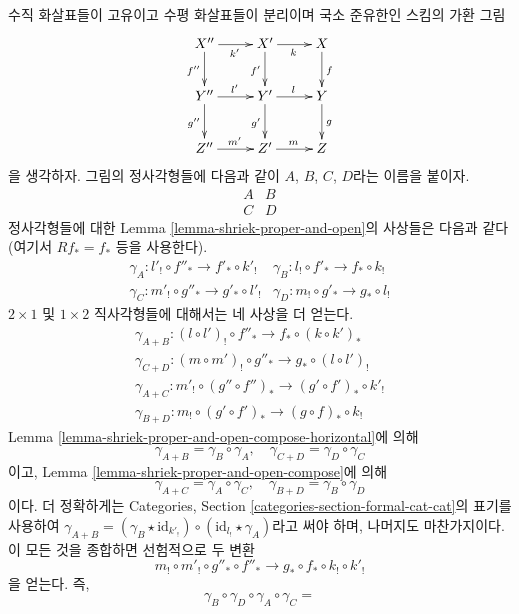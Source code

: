 \begin{remark}
\label{remark-going-around}
수직 화살표들이 고유이고 수평 화살표들이 분리이며 국소 준유한인
스킴의 가환 그림
$$
\xymatrix{
X'' \ar[r]_{k'} \ar[d]_{f''} & X' \ar[r]_k \ar[d]_{f'} & X \ar[d]^f \\
Y'' \ar[r]^{l'} \ar[d]_{g''} & Y' \ar[r]^l \ar[d]_{g'} & Y \ar[d]^g \\
Z'' \ar[r]^{m'} & Z' \ar[r]^m & Z
}
$$
을 생각하자. 그림의 정사각형들에 다음과 같이 $A$, $B$, $C$, $D$라는
이름을 붙이자.
$$
\begin{matrix}
A & B \\
C & D
\end{matrix}
$$
정사각형들에 대한 Lemma \ref{lemma-shriek-proper-and-open}의 사상들은
다음과 같다(여기서 $Rf_* = f_*$ 등을 사용한다).
$$
\begin{matrix}
\gamma_A : l'_! \circ f''_* \to f'_* \circ k'_! &
\gamma_B : l_! \circ f'_* \to f_* \circ k_! \\
\gamma_C : m'_! \circ g''_* \to g'_* \circ l'_! &
\gamma_D : m_! \circ g'_* \to g_* \circ l_!
\end{matrix}
$$
$2 \times 1$ 및 $1 \times 2$ 직사각형들에 대해서는 네 사상을 더
얻는다.
$$
\begin{matrix}
\gamma_{A + B} :
(l \circ l')_! \circ f''_* \to f_* \circ (k \circ k')_*  \\
\gamma_{C + D} :
(m \circ m')_! \circ g''_* \to g_* \circ (l \circ l')_! \\
\gamma_{A + C} :
m'_! \circ (g'' \circ f'')_* \to (g' \circ f')_* \circ k'_! \\
\gamma_{B + D} :
m_! \circ (g' \circ f')_* \to (g \circ f)_* \circ k_!
\end{matrix}
$$
Lemma \ref{lemma-shriek-proper-and-open-compose-horizontal}에 의해
$$
\gamma_{A + B} = \gamma_B \circ \gamma_A, \quad
\gamma_{C + D} = \gamma_D \circ \gamma_C
$$
이고, Lemma \ref{lemma-shriek-proper-and-open-compose}에 의해
$$
\gamma_{A + C} = \gamma_A \circ \gamma_C, \quad
\gamma_{B + D} = \gamma_B \circ \gamma_D
$$
이다. 더 정확하게는 Categories, Section
\ref{categories-section-formal-cat-cat}의 표기를 사용하여
$\gamma_{A + B} = (\gamma_B \star \text{id}_{k'_!}) \circ
(\text{id}_{l_!} \star \gamma_A)$라고 써야 하며, 나머지도 마찬가지이다.
이 모든 것을 종합하면 선험적으로 두 변환
$$
m_! \circ m'_! \circ g''_* \circ f''_*
\longrightarrow
g_* \circ f_* \circ k_! \circ k'_!
$$
을 얻는다. 즉,
$$
\gamma_B \circ \gamma_D \circ \gamma_A \circ \gamma_C =
$$
\end{remark}
